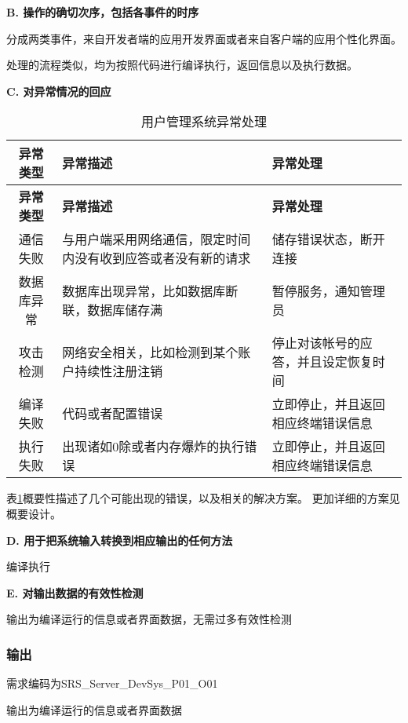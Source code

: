 {\textbf{B. 操作的确切次序，包括各事件的时序}

分成两类事件，来自开发者端的应用开发界面或者来自客户端的应用个性化界面。

处理的流程类似，均为按照代码进行编译执行，返回信息以及执行数据。


\textbf{C. 对异常情况的回应}

\begin{longtable}{|c|p{6cm}|p{6cm}|}
\caption{用户管理系统异常处理}\label{tab:server_DevSys_exception} \\
\hline
\textbf{异常类型} & \textbf{异常描述} & \textbf{异常处理}\\
\hline
\endfirsthead
\hline
\textbf{异常类型} & \textbf{异常描述} & \textbf{异常处理}\\
\hline
\endhead
\hline 
\endfoot
\hline
\endlastfoot
通信失败 & 
与用户端采用网络通信，限定时间内没有收到应答或者没有新的请求 &
储存错误状态，断开连接\\
数据库异常 & 数据库出现异常，比如数据库断联，数据库储存满 &
暂停服务，通知管理员\\
攻击检测 & 网络安全相关，比如检测到某个账户持续性注册注销 &
停止对该帐号的应答，并且设定恢复时间\\
编译失败 & 代码或者配置错误 & 立即停止，并且返回相应终端错误信息 \\
执行失败 & 出现诸如0除或者内存爆炸的执行错误 & 立即停止，并且返回相应终端错误信息\\
\end{longtable}

表\ref{tab:server_DevSys_exception}概要性描述了几个可能出现的错误，以及相关的解决方案。
更加详细的方案见概要设计。



\textbf{D. 用于把系统输入转换到相应输出的任何方法}

编译执行
		
\textbf{E. 对输出数据的有效性检测}

输出为编译运行的信息或者界面数据，无需过多有效性检测

\subsubsection{输出}

需求编码为SRS\_Server\_DevSys\_P01\_O01

输出为编译运行的信息或者界面数据
}

